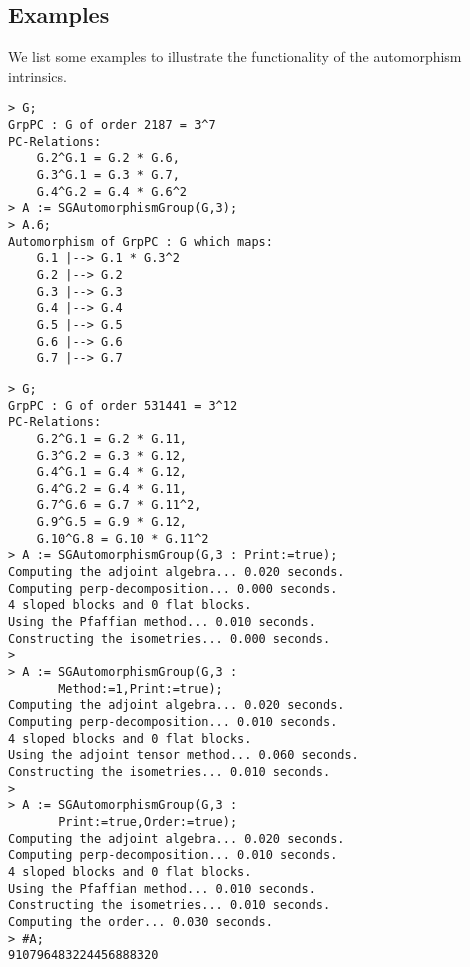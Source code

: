 \documentclass{amsart}
\begin{document}
\subsection{Examples}
We list some examples to illustrate the functionality of the automorphism intrinsics.

\begin{lstlisting}[frame=single,basicstyle=\ttfamily\color{black!30!teal},backgroundcolor=\color{white!70!gray}]
> G;
GrpPC : G of order 2187 = 3^7
PC-Relations:
    G.2^G.1 = G.2 * G.6, 
    G.3^G.1 = G.3 * G.7, 
    G.4^G.2 = G.4 * G.6^2
> A := SGAutomorphismGroup(G,3);
> A.6;
Automorphism of GrpPC : G which maps:
    G.1 |--> G.1 * G.3^2
    G.2 |--> G.2
    G.3 |--> G.3
    G.4 |--> G.4
    G.5 |--> G.5
    G.6 |--> G.6
    G.7 |--> G.7
\end{lstlisting}


\begin{lstlisting}[frame=single,basicstyle=\ttfamily\color{black!30!teal},backgroundcolor=\color{white!70!gray}]
> G;
GrpPC : G of order 531441 = 3^12
PC-Relations:
    G.2^G.1 = G.2 * G.11, 
    G.3^G.2 = G.3 * G.12, 
    G.4^G.1 = G.4 * G.12, 
    G.4^G.2 = G.4 * G.11, 
    G.7^G.6 = G.7 * G.11^2, 
    G.9^G.5 = G.9 * G.12, 
    G.10^G.8 = G.10 * G.11^2
> A := SGAutomorphismGroup(G,3 : Print:=true);
Computing the adjoint algebra... 0.020 seconds.
Computing perp-decomposition... 0.000 seconds.
4 sloped blocks and 0 flat blocks.
Using the Pfaffian method... 0.010 seconds.
Constructing the isometries... 0.000 seconds.
>
> A := SGAutomorphismGroup(G,3 : 
       Method:=1,Print:=true);
Computing the adjoint algebra... 0.020 seconds.
Computing perp-decomposition... 0.010 seconds.
4 sloped blocks and 0 flat blocks.
Using the adjoint tensor method... 0.060 seconds.
Constructing the isometries... 0.010 seconds.
>
> A := SGAutomorphismGroup(G,3 : 
       Print:=true,Order:=true);
Computing the adjoint algebra... 0.020 seconds.
Computing perp-decomposition... 0.010 seconds.
4 sloped blocks and 0 flat blocks.
Using the Pfaffian method... 0.010 seconds.
Constructing the isometries... 0.010 seconds.
Computing the order... 0.030 seconds.
> #A;
910796483224456888320
\end{lstlisting}
\end{document}
